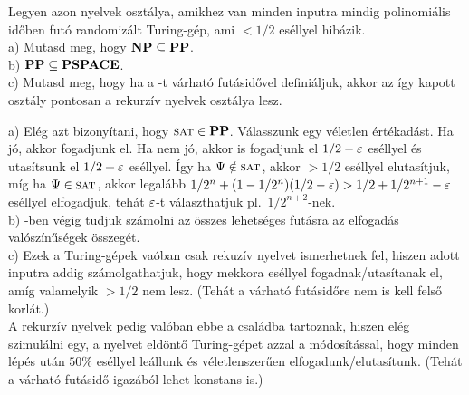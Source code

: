 \begin{Exercise}[counter={sorszam}, difficulty=0]
	Legyen \PP azon nyelvek oszt\'alya, amikhez van minden inputra mindig polinomi\'alis id\H oben fut\'o randomiz\'alt Turing-g\'ep, ami $<1/2$ es\'ellyel hib\'azik.\\
	a) Mutasd meg, hogy $\mbox{\ensuremath{\mathbf{NP}}} \subseteq \mbox{\ensuremath{\mathbf{PP}}}$.\\
	b) $\mbox{\ensuremath{\mathbf{PP}}} \subseteq \mbox{\ensuremath{\mathbf{PSPACE}}}$.\\
	c) Mutasd meg, hogy ha a \PP -t v\'arhat\'o fut\'asid\H ovel defini\'aljuk, akkor
	az \'igy kapott oszt\'aly pontosan a rekurz\'iv nyelvek oszt\'alya lesz.
\end{Exercise}	
\begin{Answer}
	a) El\'eg azt bizony\'itani, hogy $\SAT\in\PP$.
	V\'alasszunk egy v\'eletlen \'ert\'ekad\'ast.
	Ha j\'o, akkor fogadjunk el.
	Ha nem j\'o, akkor is fogadjunk el $1/2-\varepsilon$ es\'ellyel \'es utas\'itsunk el $1/2+\varepsilon$ es\'ellyel.
	\'Igy ha $\Psi\notin \SAT$, akkor $>1/2$ es\'ellyel elutas\'itjuk, m\'ig ha $\Psi\in\SAT$, akkor legal\'abb $1/2^n+(1-1/2^n)(1/2-\varepsilon)>1/2+1/2^{n+1}-\varepsilon$ es\'ellyel elfogadjuk, teh\'at $\varepsilon$-t v\'alaszthatjuk pl.\ $1/2^{n+2}$-nek.\\
	b) \PSPACE-ben v\'egig tudjuk sz\'amolni az \"osszes lehets\'eges fut\'asra az elfogad\'as val\'osz\'in\H us\'egek \"osszeg\'et.\\
	c) Ezek a Turing-g\'epek va\'oban csak rekuz\'iv nyelvet ismerhetnek fel, hiszen adott inputra addig sz\'amol\-gat\-hat\-juk, hogy mekkora es\'ellyel fogadnak/utas\'itanak el, am\'ig valamelyik $>1/2$ nem lesz.
	(Teh\'at a v\'arhat\'o fut\'asid\H ore nem is kell fels\H o korl\'at.)\\
	A rekurz\'iv nyelvek pedig val\'oban ebbe a csal\'adba tartoznak, hiszen el\'eg szimul\'alni egy, a nyelvet eld\"ont\H o Turing-g\'epet azzal a m\'odos\'it\'assal, hogy minden l\'ep\'es ut\'an $50\%$ es\'ellyel le\'allunk \'es v\'eletlenszer\H uen elfogadunk/elutas\'itunk.
	(Teh\'at a v\'arhat\'o fut\'asid\H o igaz\'ab\'ol lehet konstans is.)
\end{Answer}


















